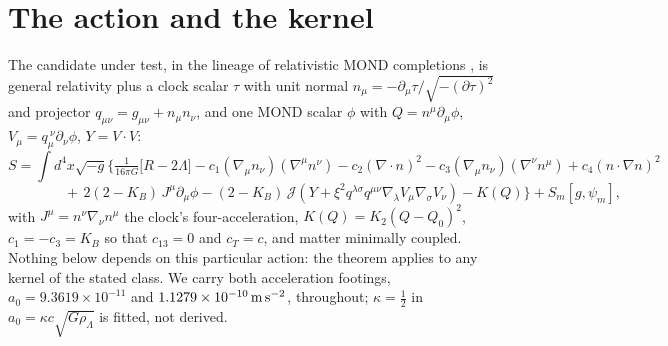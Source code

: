 \documentclass[11pt,letterpaper]{article}
\begin{document}
\begin{abstract}
Post-Newtonian $\alpha_1$ is untouched because the screening crushes its scalar drag to under $2\%$ at either kernel's own floor; the cosmological linear-source screening is untouched because, re-derived from the action, it contains no kernel dependence at all; and the dark sector's deep-MOND length is \emph{identical} for the two kernels, only its saturated value differing, by $0.568$. Clusters, as the theorem requires, are not rescued: the excess is $5.2\times$ $\nu_{\rm RAR}$'s wider ceiling against $9.1\times$ the carrier's. Finally, we close the loop the corrections open: the programme's own wide-binary prediction was evaluated at floors the carried kernel does not permit and with an interpolation that is wrong above the saturation point, and we recompute it. The pre-registered estimator returns $\gamma_v=1.0375$ and $1.0275$ for the exponential carrier at its corrected floors and $1.0450$ and $1.0300$ for $\nu_{\rm RAR}$ carried, against a stale $1.032$/$1.040$. The two corrections act in \emph{opposite} directions and are of comparable size, so the net change is not monotone in the coherence length and had to be computed rather than assumed. Every value remains far below the pre-registered band, so the prediction stays sharply distinguishable, while the anisotropy sign-flip radius moves out of the survey's usable separation range. This is a preprint of an AI-assisted draft. It claims no completed relativistic theory, no derivation of $a_0$ or of $\kappa=\tfrac12$, and no empirical detection.
\end{abstract}

\section{The action and the kernel}
The candidate under test, in the lineage of relativistic MOND completions \cite{aest}, is general relativity plus a clock scalar $\tau$ with unit normal $n_\mu=-\partial_\mu\tau/\sqrt{-(\partial\tau)^2}$ and projector $q_{\mu\nu}=g_{\mu\nu}+n_\mu n_\nu$, and one MOND scalar $\phi$ with $Q=n^\mu\partial_\mu\phi$, $V_\mu=q_\mu^{\ \nu}\partial_\nu\phi$, $Y=V\!\cdot\!V$:
\begin{equation}
S=\int d^4x\sqrt{-g}\Big\{\tfrac{1}{16\pi G}\big[R-2\Lambda\big]-c_1(\nabla_\mu n_\nu)(\nabla^\mu n^\nu)-c_2(\nabla\!\cdot\!n)^2-c_3(\nabla_\mu n_\nu)(\nabla^\nu n^\mu)+c_4(n\!\cdot\!\nabla n)^2
\end{equation}
\[
\qquad\qquad+\,2(2-K_B)\,J^\mu\partial_\mu\phi-(2-K_B)\,\mathcal J\!\left(Y+\xi^2q^{\lambda\sigma}q^{\mu\nu}\nabla_\lambda V_\mu\nabla_\sigma V_\nu\right)-K(Q)\Big\}+S_m[g,\psi_m],
\]
with $J^\mu=n^\nu\nabla_\nu n^\mu$ the clock's four-acceleration, $K(Q)=K_2(Q-Q_0)^2$, $c_1=-c_3=K_B$ so that $c_{13}=0$ and $c_T=c$, and matter minimally coupled. Nothing below depends on this particular action: the theorem applies to any kernel of the stated class. We carry both acceleration footings, $a_0=9.3619\times10^{-11}$ and $1.1279\times10^{-10}\,{\rm m\,s^{-2}}$, throughout; $\kappa=\tfrac12$ in $a_0=\kappa c\sqrt{G\rho_\Lambda}$ is fitted, not derived.
\end{document}
